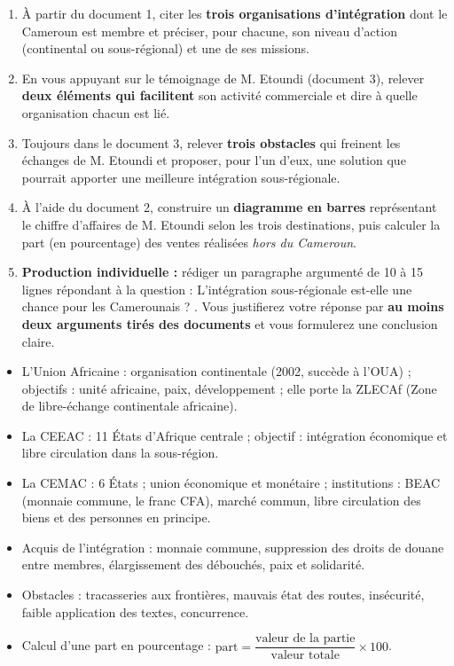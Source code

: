 \documentclass[11pt]{article}
\newcommand{\cle}[1]{{\popxbold\color{popdark}#1}}
\newcounter{popsec}
\newcounter{popsub}
\newcommand{\courssub}[1]{%
  \stepcounter{popsub}%
  \par\vspace{9pt}\noindent{\popxbold\fontsize{11.5}{13}\selectfont\color{popink}{\color{poporange}\thepopsec.\thepopsub}\hspace{6pt}#1}\par\nopagebreak\vspace{4pt}
}
\begin{document}
\begin{enumerate}
\item À partir du document 1, citer les \textbf{trois organisations d'intégration} dont le Cameroun est membre et préciser, pour chacune, son niveau d'action (continental ou sous-régional) et une de ses missions.
\item En vous appuyant sur le témoignage de M. Etoundi (document 3), relever \textbf{deux éléments qui facilitent} son activité commerciale et dire à quelle organisation chacun est lié.
\item Toujours dans le document 3, relever \textbf{trois obstacles} qui freinent les échanges de M. Etoundi et proposer, pour l'un d'eux, une solution que pourrait apporter une meilleure intégration sous-régionale.
\item À l'aide du document 2, construire un \textbf{diagramme en barres} représentant le chiffre d'affaires de M. Etoundi selon les trois destinations, puis calculer la part (en pourcentage) des ventes réalisées \emph{hors du Cameroun}.
\item \textbf{Production individuelle :} rédiger un paragraphe argumenté de 10 à 15 lignes répondant à la question : \og L'intégration sous-régionale est-elle une chance pour les Camerounais ? \fg. Vous justifierez votre réponse par \textbf{au moins deux arguments tirés des documents} et vous formulerez une conclusion claire.
\end{enumerate}

\courssub{Ressources à mobiliser}

\begin{aretenir}
\begin{itemize}
\item L'\cle{Union Africaine} : organisation continentale (2002, succède à l'OUA) ; objectifs : unité africaine, paix, développement ; elle porte la \cle{ZLECAf} (Zone de libre-échange continentale africaine).
\item La \cle{CEEAC} : 11 États d'Afrique centrale ; objectif : intégration économique et libre circulation dans la sous-région.
\item La \cle{CEMAC} : 6 États ; union économique et monétaire ; institutions : \cle{BEAC} (monnaie commune, le franc CFA), marché commun, libre circulation des biens et des personnes en principe.
\item Acquis de l'intégration : monnaie commune, suppression des droits de douane entre membres, élargissement des débouchés, paix et solidarité.
\item Obstacles : tracasseries aux frontières, mauvais état des routes, insécurité, faible application des textes, concurrence.
\item Calcul d'une part en pourcentage : $\text{part} = \dfrac{\text{valeur de la partie}}{\text{valeur totale}} \times 100$.
\end{itemize}
\end{aretenir}
\end{document}
